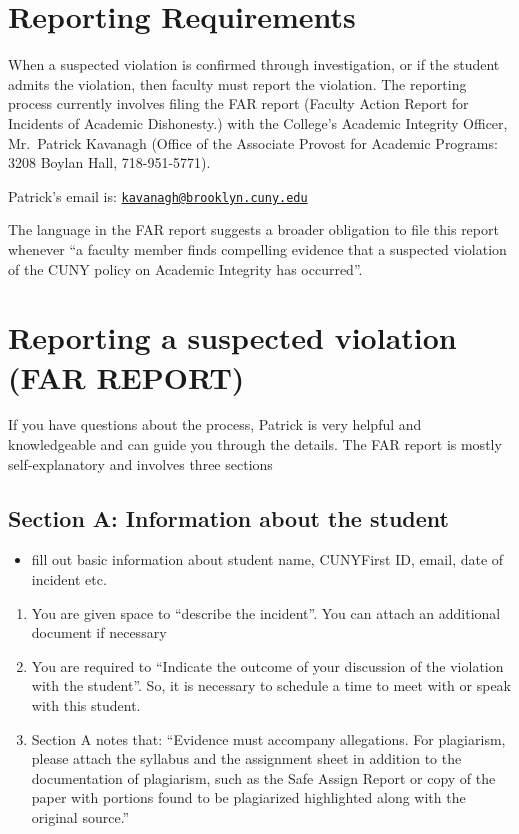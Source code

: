 \documentclass[]{book}
\providecommand{\tightlist}{%
  \setlength{\itemsep}{0pt}\setlength{\parskip}{0pt}}
\theoremstyle{definition}
\theoremstyle{definition}
\theoremstyle{definition}
\theoremstyle{remark}
\begin{document}
\section{Reporting Requirements}\label{reporting-requirements}

When a suspected violation is confirmed through investigation, or if the
student admits the violation, then faculty must report the violation.
The reporting process currently involves filing the FAR report (Faculty
Action Report for Incidents of Academic Dishonesty.) with the College's
Academic Integrity Officer, Mr.~Patrick Kavanagh (Office of the
Associate Provost for Academic Programs: 3208 Boylan Hall,
718-951-5771).

Patrick's email is:
\href{mailto:kavanagh@brooklyn.cuny.edu}{\nolinkurl{kavanagh@brooklyn.cuny.edu}}

The language in the FAR report suggests a broader obligation to file
this report whenever ``a faculty member finds compelling evidence that a
suspected violation of the CUNY policy on Academic Integrity has
occurred''.

\section{Reporting a suspected violation (FAR
REPORT)}\label{reporting-a-suspected-violation-far-report}

If you have questions about the process, Patrick is very helpful and
knowledgeable and can guide you through the details. The FAR report is
mostly self-explanatory and involves three sections

\subsection{Section A: Information about the
student}\label{section-a-information-about-the-student}

\begin{itemize}
\tightlist
\item
  fill out basic information about student name, CUNYFirst ID, email,
  date of incident etc.
\end{itemize}

\begin{enumerate}
\def\labelenumi{\alph{enumi}.}
\tightlist
\item
  You are given space to ``describe the incident''. You can attach an
  additional document if necessary
\item
  You are required to ``Indicate the outcome of your discussion of the
  violation with the student''. So, it is necessary to schedule a time
  to meet with or speak with this student.
\item
  Section A notes that: ``Evidence must accompany allegations. For
  plagiarism, please attach the syllabus and the assignment sheet in
  addition to the documentation of plagiarism, such as the Safe Assign
  Report or copy of the paper with portions found to be plagiarized
  highlighted along with the original source.''
\end{enumerate}
\end{document}
